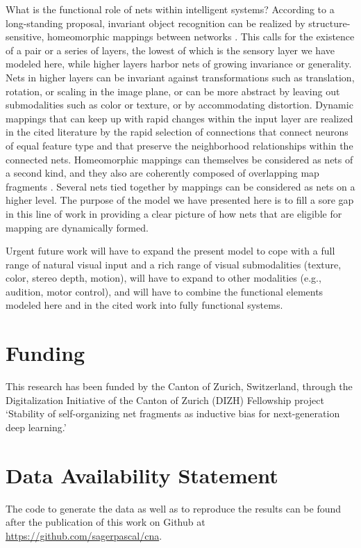 \documentclass[12pt]{article}
\begin{document}
What is the functional role of nets within intelligent systems?  According to a long-standing proposal, invariant object recognition can be realized by structure-sensitive, homeomorphic mappings between networks \citep{von_der_malsburg_correlation_1981, anderson_shifter_1987, Olshausen1995, wiskott_face_1997, Arathorn2002, wolfrum_recurrent_2008, Memisevic2010, von_der_malsburg_theory_2022}. This calls for the existence of a pair or a series of layers, the lowest of which is the sensory layer we have modeled here, while higher layers harbor nets of growing invariance or generality.  Nets in higher layers can be invariant against transformations such as translation, rotation, or scaling in the image plane, or can be more abstract by leaving out submodalities such as color or texture, or by accommodating distortion. Dynamic mappings that can keep up with rapid changes within the input layer are realized in the cited literature by the rapid selection of connections that connect neurons of equal feature type and that preserve the neighborhood relationships within the connected nets. Homeomorphic mappings can themselves be considered as nets of a second kind, and they also are coherently composed of overlapping map fragments \citep{anderson_shifter_1987, ZHU2004}.  Several nets tied together by mappings can be considered as nets on a higher level. The purpose of the model we have presented here is to fill a sore gap in this line of work in providing a clear picture of how nets that are eligible for mapping are dynamically formed.

Urgent future work will have to expand the present model to cope with a full range of natural visual input and a rich range of visual submodalities (texture, color, stereo depth, motion), will have to expand to other modalities (e.g., audition, motor control), and will have to combine the functional elements modeled here and in the cited work into fully functional systems.

\section*{Funding}
This research has been funded by the Canton of Zurich, Switzerland, through the Digitalization Initiative of the Canton of Zurich (DIZH) Fellowship project `Stability of self-organizing net fragments as inductive bias for next-generation deep learning.'


\section*{Data Availability Statement}
The code to generate the data as well as to reproduce the results can be found after the publication of this work on Github at \url{https://github.com/sagerpascal/cna}.
\end{document}

